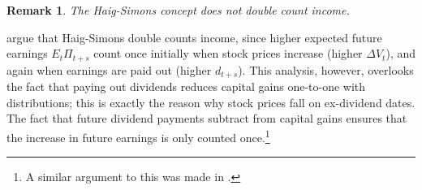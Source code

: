 \documentclass[12pt]{article}
\newtheorem{remark}{Remark}
\begin{document}
\begin{remark} \label{remark:doublec} The Haig-Simons concept does not double count income. \end{remark} 
\citet{CanberraGroup2001,splinter2025distribution} argue that Haig-Simons double counts income, since higher expected future earnings $E_t \Pi_{t+s}$ count once initially when stock prices increase (higher $\Delta V_t$), and again when earnings are paid out (higher $d_{t+s}$). This analysis, however, overlooks the fact that paying out dividends reduces capital gains one-to-one with distributions; this is exactly the reason why stock prices fall on ex-dividend dates. The fact that future dividend payments subtract from capital gains ensures that the increase in future earnings is only counted once.\footnote{A similar argument to this was made in  \citet{larrimore2021recent}.} 




\end{document}
